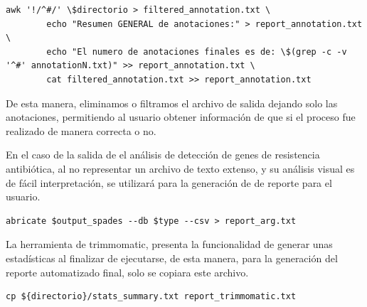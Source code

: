 \documentclass[12pt]{article}
\begin{document}

\begin{center}
    \begin{lstlisting}[caption={Comandos para la generación del reporte de anotación funcional \emph{(elaboración propia)}.}, label=lst:statsAnnotation]
        awk '!/^#/' \$directorio > filtered_annotation.txt \
        echo "Resumen GENERAL de anotaciones:" > report_annotation.txt \
        echo "El numero de anotaciones finales es de: \$(grep -c -v '^#' annotationN.txt)" >> report_annotation.txt \
        cat filtered_annotation.txt >> report_annotation.txt
    \end{lstlisting}
\end{center}

De esta manera, eliminamos o filtramos el archivo de salida dejando solo las anotaciones, permitiendo
al usuario obtener información de que si el proceso fue realizado de manera correcta o no.

En el caso de la salida de el análisis de detección de genes de resistencia antibiótica, al no representar un 
archivo de texto extenso, y su análisis visual es de fácil interpretación, se utilizará para la 
generación de de reporte para el usuario.

\begin{center}
    \begin{lstlisting}[caption={Comandos para la generación del reporte de análisis de detección de resistencia antibiótica \emph{(elaboración propia)}.}, label=lst:statsARG]
        abricate $output_spades --db $type --csv > report_arg.txt
    \end{lstlisting}
\end{center}

La herramienta de trimmomatic, presenta la funcionalidad de generar unas estadísticas al finalizar de 
ejecutarse, de esta manera, para la generación del reporte automatizado final, solo se copiara este archivo.

\begin{center}
    \begin{lstlisting}[caption={Comando para el reporte de la ejecución de trimmomatic \emph{(elaboración propia)}.}, label=lst:statsTrimmo]
        cp ${directorio}/stats_summary.txt report_trimmomatic.txt
    \end{lstlisting}
\end{center}
\end{document}
